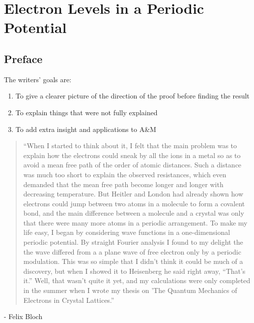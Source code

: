 \chapter{Electron Levels in a Periodic Potential}

\listoftodos

\section{Preface}





The writers' goals are:
\begin{enumerate}
	\item To give a clearer picture of the direction of the proof before finding the result
	\item To explain things that were not fully explained
	\item To add extra insight and applications to A\&M
\end{enumerate}


\begin{quotation}
	``When I started to think about it, I felt that the main problem was to explain how the electrons could sneak by all the ions in a metal so as to avoid a mean free path of the order of atomic distances. Such a distance was much too short to explain the observed resistances, which even demanded that the mean free path become longer and longer with decreasing temperature. But Heitler and London had already shown how electrons could jump between two atoms in a molecule to form a covalent bond, and the main difference between a molecule and a crystal was only that there were many more atoms in a periodic arrangement. To make my life easy, I began by considering wave functions in a one-dimensional periodic potential. By straight Fourier analysis I found to my delight the the wave differed from a a plane wave of free electron only by a periodic modulation.
	This was so simple that I didn’t think it could be much of a discovery, but when I showed it to Heisenberg he said right away, “That’s it.” Well, that wasn’t quite it yet, and my calculations were only completed in the summer when I wrote my thesis on 'The Quantum Mechanics of Electrons in Crystal Lattices.''
\end{quotation}
- Felix Bloch



